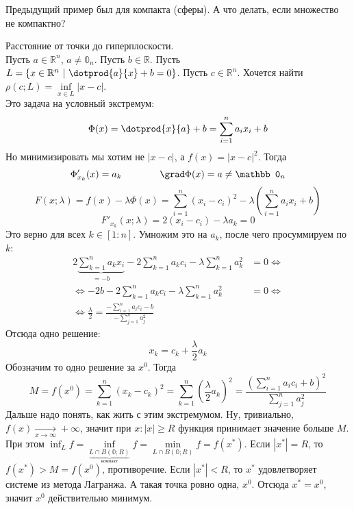 \documentclass{article}
\begin{document}
\begin{itemize}
\begin{Comment}
            Предыдущий пример был для компакта (сферы). А что делать, если множество не компактно?
        \end{Comment}
        \begin{Example}
            Расстояние от точки до гиперплоскости.\\
            Пусть $a\in\mathbb R^n$, $a\neq\mathbb0_n$. Пусть $b\in\mathbb R$. Пусть $L=\left\{x\in\mathbb R^n~\middle|~\dotprod{a}{x}+b=0\right\}$. Пусть $c\in\mathbb R^n$. Хочется найти $\rho(c;L)=\inf\limits_{x\in L}|x-c|$.\\
            Это задача на условный экстремум:
            $$
            \Phi(x)=\dotprod{x}{a}+b=\sum\limits_{i=1}^na_ix_i+b
            $$
            Но минимизировать мы хотим не $|x-c|$, а $f(x)=|x-c|^2$. Тогда
            $$
            \Phi'_{x_k}(x)=a_k\qquad\qquad\grad\Phi(x)=a\neq\mathbb0_n
            $$
            $$
            F(x;\lambda)=f(x)-\lambda\Phi(x)=\sum\limits_{i=1}^n(x_i-c_i)^2-\lambda\left(\sum\limits_{i=1}^na_ix_i+b\right)
            $$
            $$
            F'_{x_k}(x;\lambda)=2(x_i-c_i)-\lambda a_k=0
            $$
            Это верно для всех $k\in[1:n]$. Умножим это на $a_k$, после чего просуммируем по $k$:
            \[\begin{split}
                2\underbrace{\sum\limits_{k=1}^na_kx_i}_{=-b}-2\sum\limits_{k=1}^na_kc_i-\lambda\sum\limits_{k=1}^na_k^2&=0\Leftrightarrow\\\Leftrightarrow
                -2b-2\sum\limits_{k=1}^na_kc_i-\lambda\sum\limits_{k=1}^na_k^2&=0\Leftrightarrow\\\Leftrightarrow
                \frac\lambda2=\frac{-\sum\limits_{i=1}^na_ic_i-b}{-\sum\limits_{j=1}^na_j^2}&
            \end{split}\]
            Отсюда одно решение:
            $$
            x_k=c_k+\frac\lambda2a_k
            $$
            Обозначим то одно решение за $x^0$. Тогда
            $$M=f(x^0)=\sum\limits_{k=1}^n(x_k-c_k)^2=\sum\limits_{k=1}^n\left(\frac\lambda2a_k\right)^2=\frac{\left(\sum\limits_{i=1}^na_ic_i+b\right)^2}{\sum\limits_{j=1}^na_j^2}$$
            Дальше надо понять, как жить с этим экстремумом. Ну, тривиально, $f(x)\underset{x\to\infty}\longrightarrow+\infty$, значит при $x:|x|\geqslant R$ функция принимает значение больше $M$. При этом $\inf_Lf=\inf\limits_{\underbrace{L\cap B(\mathbb0;R)}_{\text{компакт}}}f=\min\limits_{L\cap B(\mathbb0;R)}f=f(x^*)$. Если $|x^*|=R$, то $f(x^*)>M=f(x^0)$, противоречие. Если $|x^*|<R$, то $x^*$ удовлетворяет системе из метода Лагранжа. А такая точка ровно одна, $x^0$. Отсюда $x^*=x^0$, значит $x^0$ действительно минимум.\\

\end{Example}
\end{itemize}
\end{document}
